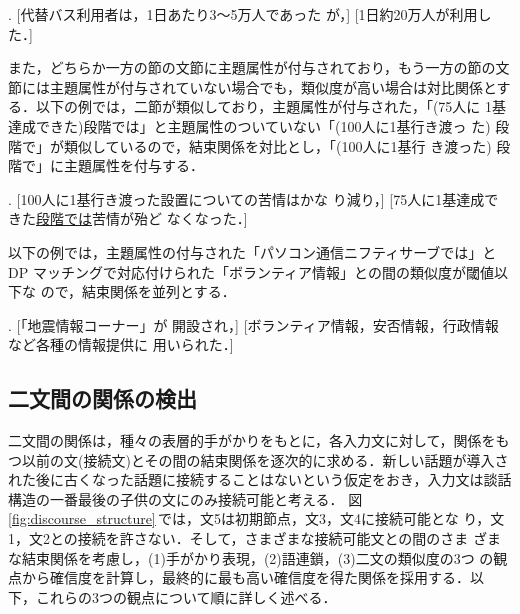 \ex. [代替バス利用者は，1日あたり3〜5万人であった
が，] [1日約20万人が利用した．]\label{ex:bus}

また，どちらか一方の節の文節に主題属性が付与されており，もう一方の節の文
節には主題属性が付与されていない場合でも，類似度が高い場合は対比関係とす
る．以下の例では，二節が類似しており，主題属性が付与された，「(75人に
1基達成できた)段階では」と主題属性のついていない「(100人に1基行き渡っ
た) 段階で」が類似しているので，結束関係を対比とし，「(100人に1基行
き渡った) 段階で」に主題属性を付与する．

\ex. [100人に1基行き渡った設置についての苦情はかな
り減り，] [75人に1基達成できた\underline{\underline{段階では}}苦情が殆ど
なくなった．]

以下の例では，主題属性の付与された「パソコン通信ニフティサーブでは」とDP 
マッチングで対応付けられた「ボランティア情報」との間の類似度が閾値以下な
ので，結束関係を並列とする．

\ex. [「地震情報コーナー」が
開設され，] [ボランティア情報，安否情報，行政情報など各種の情報提供に
用いられた．]


\subsection{二文間の関係の検出}
\label{subsec:relation_two_sentences}

二文間の関係は，種々の表層的手がかりをもとに，各入力文に対して，関係をも
つ以前の文(接続文)とその間の結束関係を逐次的に求める．新しい話題が導入さ
れた後に古くなった話題に接続することはないという仮定をおき，入力文は談話
構造の一番最後の子供の文にのみ接続可能と考える．
図\ref{fig:discourse_structure}\,では，文5は初期節点，文3，文4に接続可能とな
り，文1，文2との接続を許さない．そして，さまざまな接続可能文との間のさま
ざまな結束関係を考慮し，(1)手がかり表現，(2)語連鎖，(3)二文の類似度の3つ
の観点から確信度を計算し，最終的に最も高い確信度を得た関係を採用する．以
下，これらの3つの観点について順に詳しく述べる．

